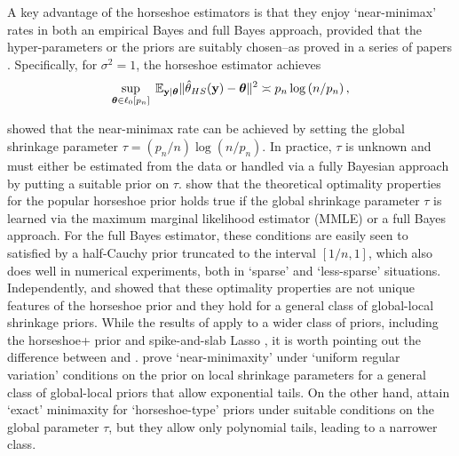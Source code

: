 \documentclass[sts,preprint]{imsart}
\begin{document}
A key advantage of the horseshoe estimators is that they enjoy `near-minimax' rates in both an empirical Bayes and full Bayes approach, provided that the hyper-parameters or the priors are suitably chosen--as proved in a series of papers \citep{van2014horseshoe,van2015conditions,van2016many,van2017adaptive}. Specifically, for $\sigma^2 = 1$, the horseshoe estimator achieves
\begin{equation}
  \sup_{ \boldsymbol{\theta} \in \ell_0[p_n] } \; \mathbb{E}_{ {\bf y} \mid \boldsymbol{\theta} } \lVert {\hat{\theta}}_{HS}{} ({\bf y}) -
  \boldsymbol{\theta} \rVert^2 \asymp p_n \log \left ( n / p_n \right ),
  \label{eq:minimax}
\end{equation}

\citet{van2014horseshoe} showed that the near-minimax rate can be achieved by setting the global shrinkage parameter $\tau = (p_n/n) \log(n/p_n)$. In practice, $\tau$ is unknown and must either be estimated from the data or handled via a fully Bayesian approach by putting a suitable prior on $\tau$. \cite{van2017adaptive} show that the theoretical optimality properties for the popular horseshoe prior holds true if the global shrinkage parameter $\tau$ is learned via the maximum marginal likelihood estimator (MMLE) or a full Bayes approach. For the full Bayes estimator, these conditions are easily seen to
satisfied by a half-Cauchy prior truncated to the interval $[1/n,1]$, which also does well in numerical experiments, both in `sparse' and `less-sparse'
situations. Independently, \citet{van2015conditions} and \citet{ghosh2016asymptotic} showed that these optimality properties are not unique features of the horseshoe prior and they hold for a general class of
global-local shrinkage priors. While the results of \cite{van2015conditions} apply to a wider class of priors, including the horseshoe+ prior
\citep{bhadra2015horseshoe+} and spike-and-slab Lasso
\citep{rovckova2016spike}, it is worth pointing out the difference between \citet{van2015conditions} and \citet{ghosh2016asymptotic}. \citet{van2015conditions} prove `near-minimaxity' under `uniform regular variation' conditions on the prior on local shrinkage parameters for a general class of global-local priors that allow exponential tails. On the other hand, \citet{ghosh2016asymptotic} attain `exact' minimaxity for `horseshoe-type' priors under suitable conditions on the global parameter $\tau$, but they allow only polynomial tails, leading to a narrower class.

%
\end{document}
